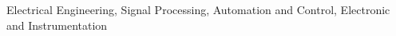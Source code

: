 \documentclass[oneside,diss]{deletex}
\title{\disstitle}
\author{Giacomolli}{Anderson Antônio}
\date{março}{2014}
\begin{document}
\maketitle





\begin{abstract}
  
\end{abstract}

\begin{englishabstract}{Electrical Engineering, Signal Processing, Automation and Control,
    Electronic and Instrumentation}
  
\end{englishabstract}

\listoffigures

\listoftables

\end{document}
